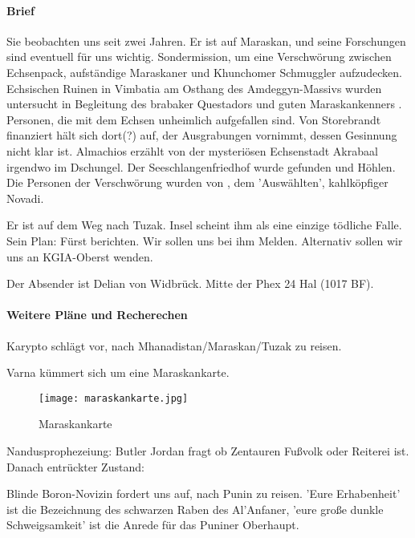 \paragraph{Brief}
\label{sec:brief}
Sie beobachten uns seit zwei Jahren. Er ist auf Maraskan, und seine Forschungen sind eventuell für uns wichtig. Sondermission, um eine Verschwörung zwischen Echsenpack, aufständige Maraskaner und Khunchomer Schmuggler aufzudecken. 
Echsischen Ruinen in Vimbatia am Osthang des Amdeggyn-Massivs wurden untersucht in Begleitung des brabaker Questadors und guten Maraskankenners . Personen, die mit dem Echsen unheimlich aufgefallen sind. Von Storebrandt finanziert hält sich  dort(?) auf, der Ausgrabungen vornimmt, dessen Gesinnung nicht klar ist. Almachios erzählt von der mysteriösen Echsenstadt Akrabaal irgendwo im Dschungel. Der Seeschlangenfriedhof wurde gefunden und Höhlen. Die Personen der Verschwörung wurden von , dem 'Auswählten', kahlköpfiger Novadi. 

Er ist auf dem Weg nach Tuzak. Insel scheint ihm als eine einzige tödliche Falle. Sein Plan: Fürst  berichten. Wir sollen uns bei ihm Melden. Alternativ sollen wir uns an KGIA-Oberst  wenden. 

Der Absender ist Delian von Widbrück. Mitte der Phex 24 Hal (1017 BF). 

\paragraph{Weitere Pläne und Recherechen}
\label{sec:weitere-plane}
Karypto schlägt vor, nach Mhanadistan/Maraskan/Tuzak zu reisen. 

Varna kümmert sich um eine Maraskankarte. 

\begin{figure*}[ht!]
  \centering
  \texttt{[image: maraskankarte.jpg]}
  \caption{Maraskankarte}
\end{figure*}

Nandusprophezeiung: Butler Jordan fragt ob Zentauren Fußvolk oder Reiterei ist. Danach entrückter Zustand: 

Blinde Boron-Novizin  fordert uns auf, nach Punin zu reisen. 'Eure Erhabenheit' ist die Bezeichnung des schwarzen Raben des Al'Anfaner, 'eure große dunkle Schweigsamkeit' ist die Anrede für das Puniner Oberhaupt.

